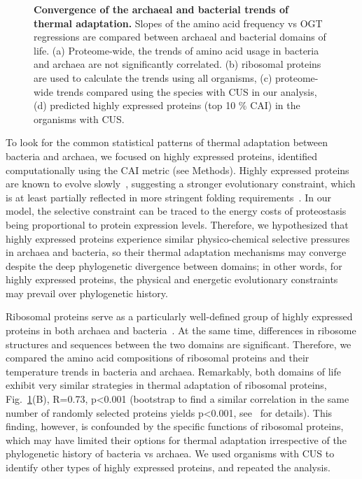 \documentclass[10pt,letterpaper]{article}
\begin{document}
\begin{figure}[h!]
\caption{
{\bf Convergence of the archaeal and bacterial trends of thermal adaptation.} Slopes of the amino acid frequency vs OGT regressions are compared between archaeal and bacterial domains of life.
(a) Proteome-wide, the trends of amino acid usage in bacteria and archaea are not significantly correlated.
(b) ribosomal proteins are used to calculate the trends using all organisms,
(c) proteome-wide trends compared using the species with CUS in our analysis,
(d) predicted highly expressed proteins (top 10 \% CAI) in the organisms with CUS.
}
\label{fig:fig2}
\end{figure}

To look for the common statistical patterns of thermal adaptation between bacteria and archaea, we focused on highly expressed proteins, identified computationally using the CAI metric (see Methods). Highly expressed proteins are known to evolve slowly~\cite{Pal2001Highly,Rocha2004An}, suggesting a stronger evolutionary constraint, which is at least partially reflected in more stringent folding requirements~\cite{Serohijos2012Protein,Drummond2005Why,Drummond2008MistranslationInduced}. %
In our model, the selective constraint can be traced to the energy costs of proteostasis being proportional to protein expression levels. Therefore, we hypothesized that highly expressed proteins experience similar physico-chemical selective pressures in archaea and bacteria, so their thermal adaptation mechanisms may converge despite the deep phylogenetic divergence between domains; in other words, for highly expressed proteins, the physical and energetic evolutionary constraints may prevail over phylogenetic history.

Ribosomal proteins serve as a particularly well-defined group of highly expressed proteins in both archaea and bacteria~\cite{Karlin2005Predicted}. At the same time, differences in ribosome structures and sequences between the two domains are significant. Therefore, we compared the amino acid compositions  of ribosomal proteins and their temperature trends in bacteria and archaea. Remarkably, both domains of life exhibit very similar strategies in thermal adaptation of ribosomal proteins, Fig.~\ref{fig:fig2}(B), R=0.73, p\textless 0.001 (bootstrap to find a similar correlation in the same number of randomly selected proteins yields p\textless0.001, see~ for details).
 This finding, however, is confounded by the specific functions of ribosomal proteins, which may have limited their options for thermal adaptation irrespective of the phylogenetic history of bacteria vs archaea. We used organisms with CUS to identify other types of highly expressed proteins, and repeated the analysis.
 
\end{document}
